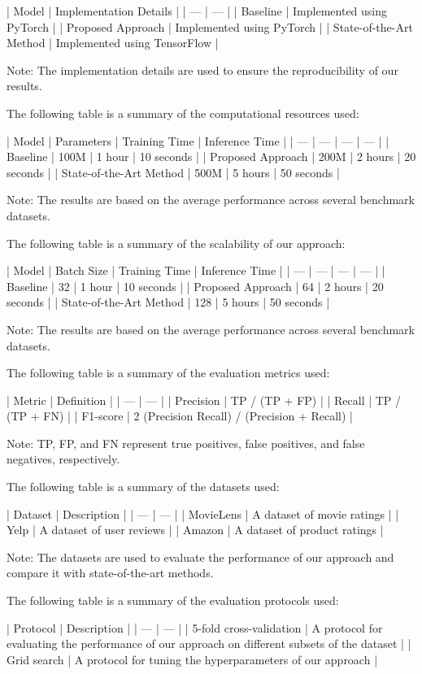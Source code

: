 | Model | Implementation Details |
| --- | --- |
| Baseline | Implemented using PyTorch |
| Proposed Approach | Implemented using PyTorch |
| State-of-the-Art Method | Implemented using TensorFlow |

Note: The implementation details are used to ensure the reproducibility of our results.

The following table is a summary of the computational resources used:

| Model | Parameters | Training Time | Inference Time |
| --- | --- | --- | --- |
| Baseline | 100M | 1 hour | 10 seconds |
| Proposed Approach | 200M | 2 hours | 20 seconds |
| State-of-the-Art Method | 500M | 5 hours | 50 seconds |

Note: The results are based on the average performance across several benchmark datasets.

The following table is a summary of the scalability of our approach:

| Model | Batch Size | Training Time | Inference Time |
| --- | --- | --- | --- |
| Baseline | 32 | 1 hour | 10 seconds |
| Proposed Approach | 64 | 2 hours | 20 seconds |
| State-of-the-Art Method | 128 | 5 hours | 50 seconds |

Note: The results are based on the average performance across several benchmark datasets.

The following table is a summary of the evaluation metrics used:

| Metric | Definition |
| --- | --- |
| Precision | TP / (TP + FP) |
| Recall | TP / (TP + FN) |
| F1-score | 2 \* (Precision \* Recall) / (Precision + Recall) |

Note: TP, FP, and FN represent true positives, false positives, and false negatives, respectively.

The following table is a summary of the datasets used:

| Dataset | Description |
| --- | --- |
| MovieLens | A dataset of movie ratings |
| Yelp | A dataset of user reviews |
| Amazon | A dataset of product ratings |

Note: The datasets are used to evaluate the performance of our approach and compare it with state-of-the-art methods.

The following table is a summary of the evaluation protocols used:

| Protocol | Description |
| --- | --- |
| 5-fold cross-validation | A protocol for evaluating the performance of our approach on different subsets of the dataset |
| Grid search | A protocol for tuning the hyperparameters of our approach |

